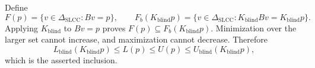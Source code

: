 Define
\[
F(p)=\{v\in\Delta_{\mathrm{SLCC}}:Bv=p\},\qquad
F_b(K_{\mathrm{blind}}p)
=\{v\in\Delta_{\mathrm{SLCC}}:K_{\mathrm{blind}}Bv=K_{\mathrm{blind}}p\}.
\]
Applying \(K_{\mathrm{blind}}\) to \(Bv=p\) proves \(F(p)\subseteq F_b(K_{\mathrm{blind}}p)\).  Minimization over the larger set cannot increase, and maximization cannot decrease.  Therefore
\[
L_{\mathrm{blind}}(K_{\mathrm{blind}}p)\leq L(p)\leq U(p)
\leq U_{\mathrm{blind}}(K_{\mathrm{blind}}p),
\]
which is the asserted inclusion.